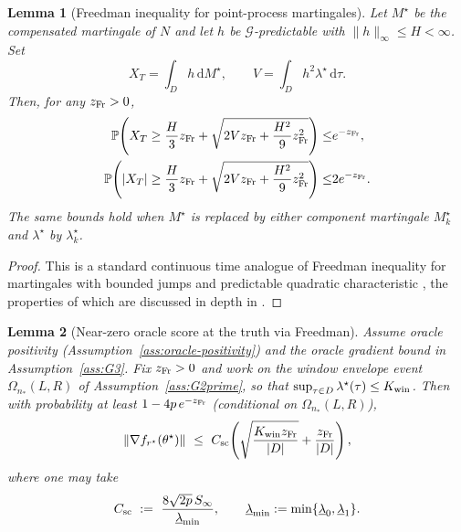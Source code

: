 \documentclass{statsoc}
\newtheorem{lemma}[lemma]{Lemma}
\newcommand{\bbP}{\mathbb{P}}
\newcommand{\dd}{\mathrm{d}}
\newcommand{\1}{\mathbbm{1}}
\begin{document}
\begin{lemma}[Freedman inequality for point-process martingales]\label{lem:Freedman}
Let $M^\star$ be the compensated martingale of $N$ and let $h$ be $\mathcal G$-predictable with $\|h\|_\infty\le H<\infty$. Set
\[
X_T=\int_D h\,\dd M^\star,\qquad
V=\int_D h^2 \lambda^\star\,\dd\tau.
\]
Then, for any $z_{\rm Fr}>0$,
\begin{align*}
\bbP\!\left(X_T \ge \frac{H}{3} z_{\rm Fr} + \sqrt{ 2Vz_{\rm Fr} + \frac{H^2}{9}z_{\rm Fr}^2 }\right)\le& e^{-z_{\rm Fr}},\\
\bbP\!\left(|X_T| \ge \frac{H}{3} z_{\rm Fr} + \sqrt{ 2Vz_{\rm Fr} + \frac{H^2}{9}z_{\rm Fr}^2 }\right)\le& 2e^{-z_{\rm Fr}}.
\end{align*}
The same bounds hold when $M^\star$ is replaced by either component martingale $M_k^\star$ and $\lambda^\star$ by $\lambda_k^\star$.
\end{lemma}

\begin{proof}
This is a standard continuous time analogue of Freedman inequality for martingales with bounded jumps and predictable quadratic characteristic \citep{freedman1975tail}, the properties of which are discussed in depth in \citet{DZHAPARIDZE2001109}.
\end{proof}

\begin{lemma}[Near-zero oracle score at the truth via Freedman]\label{lem:score-nearzero}
Assume oracle positivity (Assumption~\ref{ass:oracle-positivity}) and the oracle gradient bound in
Assumption~\ref{ass:G3}. Fix $z_{\rm Fr}>0$ and work on the window envelope event
$\Omega_{n_*}(L,R)$ of Assumption~\ref{ass:G2prime}, so that $\sup_{\tau\in D}\lambda^\star(\tau)\le K_{\rm win}$.
Then with probability at least $1-4p\,e^{-z_{\rm Fr}}$ (conditional on $\Omega_{n_*}(L,R)$),
\[
\|\nabla f_{r^\star}(\theta^\star)\|
\ \le\ C_{\rm sc}\!\left(\sqrt{\frac{K_{\rm win} z_{\rm Fr}}{|D|}} + \frac{z_{\rm Fr}}{|D|}\right),
\]
where one may take
\[
C_{\rm sc}\ :=\ \frac{8\sqrt{2p}\,S_\infty}{\underline\lambda_{\min}},
\qquad
\underline\lambda_{\min}:=\min\{\underline\lambda_0,\underline\lambda_1\}.
\]
\end{lemma}
\end{document}
